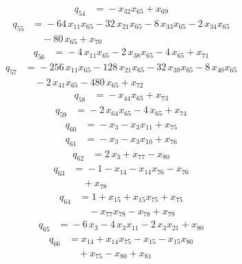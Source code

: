 \begin{align*}
q_{54} &={}-x_{32}x_{65} +x_{69}
\end{align*}
\begin{align*}
q_{55} &={}-64\,x_{11}x_{65} -32\,x_{21}x_{65} -8\,x_{33}x_{65} -2\,x_{34}x_{65}\\
&\quad -80\,x_{65} +x_{70}
\end{align*}
\begin{align*}
q_{56} &={}-4\,x_{11}x_{65} -2\,x_{38}x_{65} -4\,x_{65} +x_{71}
\end{align*}
\begin{align*}
q_{57} &={}-256\,x_{11}x_{65} -128\,x_{21}x_{65} -32\,x_{39}x_{65} -8\,x_{40}x_{65}\\
&\quad -2\,x_{41}x_{65} -480\,x_{65} +x_{72}
\end{align*}
\begin{align*}
q_{58} &={}-x_{44}x_{65} +x_{73}
\end{align*}
\begin{align*}
q_{59} &={}-2\,x_{64}x_{65} -4\,x_{65} +x_{74}
\end{align*}
\begin{align*}
q_{60} &={}-x_{3} -x_{3}x_{11} +x_{75}
\end{align*}
\begin{align*}
q_{61} &={}-x_{3} -x_{3}x_{10} +x_{76}
\end{align*}
\begin{align*}
q_{62} &={}2\,x_{3} +x_{77} -x_{80}
\end{align*}
\begin{align*}
q_{63} &={}-1 -x_{14} -x_{14}x_{76} -x_{76}\\
&\quad +x_{78}
\end{align*}
\begin{align*}
q_{64} &={}1 +x_{15} +x_{15}x_{75} +x_{75}\\
&\quad -x_{77}x_{78} -x_{78} +x_{79}
\end{align*}
\begin{align*}
q_{65} &={}-6\,x_{3} -4\,x_{3}x_{11} -2\,x_{3}x_{21} +x_{80}
\end{align*}
\begin{align*}
q_{66} &={}x_{14} +x_{14}x_{75} -x_{15} -x_{15}x_{80}\\
&\quad +x_{75} -x_{80} +x_{81}
\end{align*}
